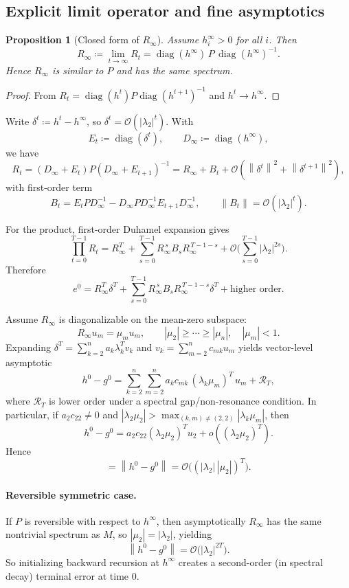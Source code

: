 \documentclass[11pt]{article}
\newcommand{\diag}{\operatorname{diag}}
\newcommand{\norm}[1]{\left\lVert #1\right\rVert}
\newtheorem{proposition}{Proposition}
\begin{document}
\subsection*{Explicit limit operator and fine asymptotics}
\begin{proposition}[Closed form of $R_\infty$]
Assume $h^\infty_i>0$ for all $i$. Then
\[
R_\infty
\coloneqq \lim_{t\to\infty}R_t
=\diag(h^\infty)\,P\,\diag(h^\infty)^{-1}.
\]
Hence $R_\infty$ is similar to $P$ and has the same spectrum.
\end{proposition}
\begin{proof}
From $R_t=\diag(h^t)P\diag(h^{t+1})^{-1}$ and $h^t\to h^\infty$.
\end{proof}

Write $\delta^t\coloneqq h^t-h^\infty$, so $\delta^t=\mathcal O(|\lambda_2|^t)$. With
\[
E_t\coloneqq \diag(\delta^t),\qquad D_\infty\coloneqq \diag(h^\infty),
\]
we have
\[
R_t=(D_\infty+E_t)P(D_\infty+E_{t+1})^{-1}
=R_\infty + B_t + \mathcal O(\norm{\delta^t}^2+\norm{\delta^{t+1}}^2),
\]
with first-order term
\[
B_t = E_t P D_\infty^{-1}-D_\infty P D_\infty^{-1}E_{t+1}D_\infty^{-1},
\qquad
\norm{B_t}=\mathcal O(|\lambda_2|^t).
\]

For the product, first-order Duhamel expansion gives
\[
\prod_{t=0}^{T-1}R_t
=R_\infty^T
+\sum_{s=0}^{T-1}R_\infty^{\,s}B_sR_\infty^{\,T-1-s}
+\mathcal O\!\Big(\sum_{s=0}^{T-1}|\lambda_2|^{2s}\Big).
\]
Therefore
\[
e^0
=R_\infty^T\delta^T
+\sum_{s=0}^{T-1}R_\infty^{\,s}B_sR_\infty^{\,T-1-s}\delta^T
+\text{higher order}.
\]

Assume $R_\infty$ is diagonalizable on the mean-zero subspace:
\[
R_\infty u_m = \mu_m u_m,
\qquad
|\mu_2|\ge\cdots\ge|\mu_n|,
\quad |\mu_m|<1.
\]
Expanding $\delta^T=\sum_{k=2}^n a_k\lambda_k^T v_k$ and $v_k=\sum_{m=2}^n c_{mk}u_m$ yields vector-level asymptotic
\[
h^0-g^0
=\sum_{k=2}^n\sum_{m=2}^n a_k c_{mk}\,(\lambda_k\mu_m)^T\,u_m
+\mathcal R_T,
\]
where $ \mathcal R_T$ is lower order under a spectral gap/non-resonance condition.
In particular, if $a_2c_{22}\neq 0$ and $|\lambda_2\mu_2|>\max_{(k,m)\neq(2,2)}|\lambda_k\mu_m|$, then
\[
h^0-g^0
= a_2c_{22}(\lambda_2\mu_2)^T u_2 + o((\lambda_2\mu_2)^T).
\]
Hence
\[
=\norm{h^0-g^0}
= \mathcal O\big((|\lambda_2|\,|\mu_2|)^T\big).
\]

\paragraph{Reversible symmetric case.}
If $P$ is reversible with respect to $h^\infty$, then asymptotically $R_\infty$ has the same nontrivial spectrum as $M$, so $|\mu_2|=|\lambda_2|$, yielding
\[
\norm{h^0-g^0}=\mathcal O\big(|\lambda_2|^{2T}\big).
\]
So initializing backward recursion at $h^\infty$ creates a second-order (in spectral decay) terminal error at time $0$.
\end{document}

